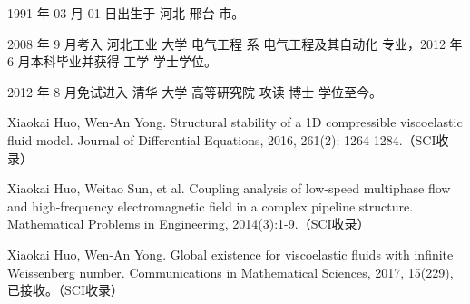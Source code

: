 \begin{resume}


  1991 年 03 月 01 日出生于 河北 邢台 市。

  2008 年 9 月考入 河北工业 大学  电气工程 系 电气工程及其自动化 专业，2012 年 6 月本科毕业并获得 工学 学士学位。

  2012 年 8 月免试进入 清华 大学 高等研究院 攻读 博士 学位至今。


  \begin{publications}
  \item Xiaokai Huo, Wen-An Yong. Structural stability of a 1D compressible viscoelastic fluid model. Journal of Differential Equations, 2016, 261(2): 1264-1284.（SCI收录）
  \item Xiaokai Huo, Weitao Sun, et al. Coupling analysis of low-speed multiphase flow and high-frequency electromagnetic field in a complex pipeline structure. Mathematical Problems in Engineering, 2014(3):1-9.（SCI收录）
  \item Xiaokai Huo, Wen-An Yong. Global existence for viscoelastic fluids with infinite Weissenberg number. Communications in Mathematical Sciences, 2017, 15(229), 已接收。（SCI收录）
  \end{publications}

\end{resume}
